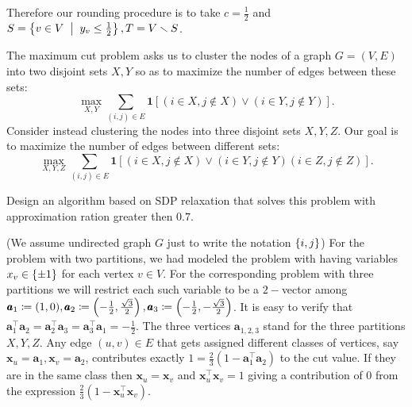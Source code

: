 \begin{enumerate}[label=(\alph*)]
Therefore our rounding procedure is to take $c=\frac12$ and  $S=\set{v\in V\st y_{v}\le\frac12},T=V\smallsetminus S$.


\end{enumerate}







\newpage
\pb

The maximum cut problem asks us to cluster the nodes of a graph $G = (V,E)$ into
two disjoint sets $X,Y$ so as to maximize the number of edges between these sets:
$$\max_{X,Y} \sum_{(i,j)\in E}\pmb 1\left[(i\in X, j\notin X) \lor (i\in Y, j\notin Y)\right].$$
Consider instead clustering the nodes into three disjoint sets $X,Y,Z$. Our goal is to maximize the number of edges between different sets:
$$\max_{X,Y,Z} \sum_{(i,j)\in E}\pmb 1\left[(i\in X, j\notin X) \lor (i\in Y, j\notin Y)(i\in Z, j\notin Z)\right].$$

Design an algorithm based on SDP relaxation that solves this problem with approximation ration greater then $0.7$.

\soln

(We assume undirected graph $G$ just to write the notation $\left\{i,j\right\}$)
For the problem with two partitions, we had modeled the problem with having variables $x_{v}\in \left\{\pm 1\right\}$ for each vertex $v\in V$. For the corresponding problem with three partitions we will restrict each such variable to be a $2-$vector among $\pmb a_{1} \coloneqq (1,0), \pmb a_{2} \coloneqq\left(-\frac12,\frac{\sqrt3}{2}\right), \pmb a_{3} \coloneqq \left(-\frac12,-\frac{\sqrt3}{2}\right)$. It is easy to verify that $\pmb a_{1}^{\top}\pmb a_{2} = \pmb a_{2}^{\top}\pmb a_{3} = \pmb a_{3}^{\top}\pmb a_{1} = -\frac12$. The three vertices $\pmb a_{1,2,3}$ stand for the three partitions $X,Y,Z$. Any edge $(u,v)\in E$ that gets assigned different classes of vertices, say $\pmb x_{u} = \pmb a_{1}, \pmb x_{v} = \pmb a_{2}$, contributes exactly $1 = \frac{2}{3}\left(1-\pmb a_{1}^{\top}\pmb a_{2}\right)$ to the cut value. If they are in the same class then $\pmb x_{u} = \pmb x_{v}$ and $\pmb x_{u}^{\top}\pmb x_{v} = 1$ giving a contribution of $0$ from the expression $\frac{2}{3}\left(1-\pmb x_{u}^{\top}\pmb x_{v}\right)$.

